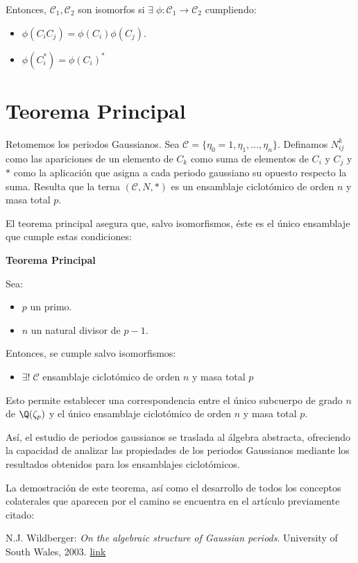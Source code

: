 \documentclass[a5paper]{article}
\renewcommand{\C}{\mathcal{C}}
\begin{document}
Entonces, $\C_1,\C_2$ son isomorfos si $\exists \; \phi : \C_1 \longrightarrow \C_2$ cumpliendo:
\begin{itemize}

\item $\phi(C_iC_j) = \phi(C_i)\phi(C_j)$.

\item $\phi(C_i^*) = \phi(C_i)^*$

\end{itemize}


\section{ Teorema Principal }


Retomemos los periodos Gaussianos. Sea $\C = \{\eta_0 = 1, \eta_1,...,\eta_n\}$. Definamos $N_{ij}^k$ como las apariciones de un elemento de $C_k$ como suma de elementos de $C_i$ y $C_j$ y $*$ como la aplicación que asigna a cada periodo gaussiano su opuesto respecto la suma. Resulta que la terna $(\C,N,*)$ es un ensamblaje ciclotómico de orden $n$ y masa total $p$.

El teorema principal asegura que, salvo isomorfismos, éste es el único ensamblaje que cumple estas condiciones:

{\bf Teorema Principal }

Sea:
\begin{itemize}

\item $p$ un primo.

\item $n$ un natural divisor de $p-1$.

\end{itemize}

Entonces, se cumple salvo isomorfismos:
\begin{itemize}
\item $\exists ! \; \C$ ensamblaje ciclotómico de orden $n$ y masa total $p$
\end{itemize}

Esto permite establecer una correspondencia entre el único subcuerpo de grado $n$ de $\Q(\zeta_p)$ y el único ensamblaje ciclotómico de orden $n$ y masa total $p$.

Así, el estudio de periodos gaussianos se traslada al álgebra abstracta, ofreciendo la capacidad de  analizar las propiedades de los periodos Gaussianos mediante los resultados obtenidos para los ensamblajes ciclotómicos.

La demostración de este teorema, así como el desarrollo de todos los conceptos colaterales que aparecen por el camino se encuentra en el artículo previamente citado:

N.J. Wildberger: {\it On the algebraic structure of Gaussian periods}. University of South Wales, 2003. \href{http://web.maths.unsw.edu.au/~norman/papers/GaussianPeriods.pdf}{link}
\end{document}

